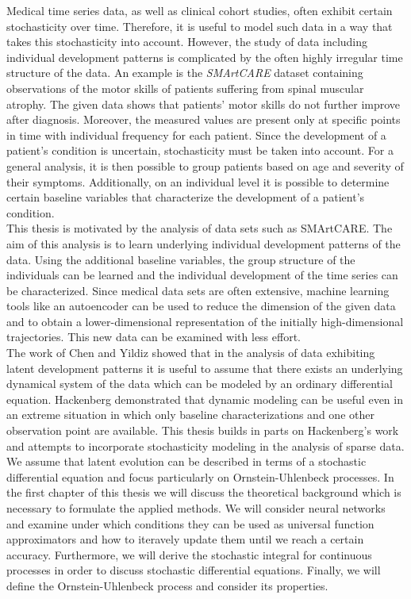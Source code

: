 \documentclass[11pt,titlepage]{article}
\theoremstyle{definition}
\theoremstyle{remark}
\begin{document}
	Medical time series data, as well as clinical cohort studies, often exhibit certain stochasticity over time. Therefore, it is useful to model such data in a way that takes this stochasticity into account. However, the study of data including individual development patterns is complicated by the often highly irregular time structure of the data. 
	An example is the \textsl{SMArtCARE} dataset containing observations of the motor skills of patients suffering from spinal muscular atrophy. The given data shows that patients' motor skills do not further improve after diagnosis. Moreover, the measured values are present only at specific points in time with individual frequency for each patient. 
	Since the development of a patient’s condition is uncertain, stochasticity must be taken into account. For a general analysis, it is then 
	possible to group patients based on age and severity of their symptoms. Additionally, on an 
	individual level it is possible to determine certain baseline variables that characterize the 
	development of a patient’s condition.\\
	This thesis is motivated by the analysis of data sets such as SMArtCARE. The aim of this analysis is to learn underlying individual development patterns of the data. Using the additional baseline variables, the group structure of the individuals can be learned and the individual development of the time series can be characterized. Since medical data sets are often extensive, machine learning 
	tools like an autoencoder can be used to reduce the dimension of the given data and to 
	obtain a lower-dimensional representation of the initially high-dimensional trajectories. This new data can be examined with less effort.\\
	The work of Chen \cite{Chen2018neural} and Yildiz \cite{Yildiz2019ode2vae} showed that in the analysis of data exhibiting latent development patterns it is useful to assume that there exists an underlying dynamical system of the data which can be modeled by an ordinary differential equation. Hackenberg \cite{Hackenberg2022} demonstrated that dynamic modeling can be useful even in an extreme situation in which only baseline characterizations and one other observation point are available. This thesis builds in parts on  Hackenberg's work and attempts to incorporate stochasticity modeling in the analysis of sparse data. We assume that latent evolution can be described in terms of a stochastic differential equation and focus particularly on Ornstein-Uhlenbeck processes. 
	\newpage
	In the first chapter of this thesis we will discuss the theoretical background which is necessary to formulate the applied methods. We will consider neural networks and examine under which conditions they can be used as universal function approximators and how to iteravely update them until we reach a certain accuracy. Furthermore, we will derive the stochastic integral for continuous processes in order to discuss stochastic differential equations. Finally, we will define the Ornstein-Uhlenbeck process and consider its properties.
\end{document}

